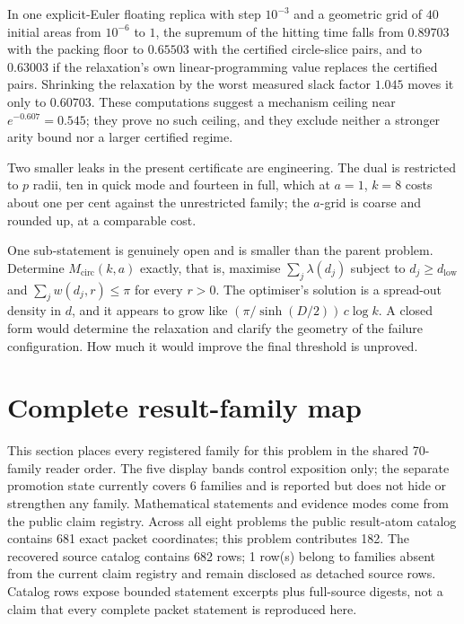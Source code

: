 \documentclass[11pt]{article}
\begin{document}
In one explicit-Euler floating replica with step $10^{-3}$ and a geometric grid
of $40$ initial areas from $10^{-6}$ to $1$, the supremum of the hitting time
falls from $0.89703$ with the packing floor to $0.65503$ with the certified
circle-slice pairs, and to $0.63003$ if the relaxation's own linear-programming
value replaces the certified pairs.  Shrinking the relaxation by the worst
measured slack factor $1.045$ moves it only to $0.60703$.  These computations
suggest a mechanism ceiling near $e^{-0.607}=0.545$; they prove no such
ceiling, and they exclude neither a stronger arity bound nor a larger certified
regime.

Two smaller leaks in the present certificate are engineering.  The dual is
restricted to $p$ radii, ten in quick mode and fourteen in full, which at
$a=1$, $k=8$ costs about one per cent against the unrestricted family; the
$a$-grid is coarse and rounded up, at a comparable cost.

One sub-statement is genuinely open and is smaller than the parent problem.
Determine $M_{\mathrm{circ}}(k,a)$ exactly, that is, maximise
$\sum_j\lambda(d_j)$ subject to $d_j\ge d_{\mathrm{low}}$ and
$\sum_jw(d_j,r)\le\pi$ for every $r>0$.  The optimiser's solution is a
spread-out density in $d$, and it appears to grow like
$(\pi/\sinh(D/2))\,c\log k$.  A closed form would determine the relaxation and
clarify the geometry of the failure configuration.  How much it would improve
the final threshold is unproved.

\clearpage
\section{Complete result-family map}\label{sec:erdos-1041-complete-family-map}

This section places every registered family for this problem in the shared 70-family reader order.  The five display bands control exposition only; the separate promotion state currently covers 6 families and is reported but does not hide or strengthen any family.  Mathematical statements and evidence modes come from the public claim registry.  Across all eight problems the public result-atom catalog contains 681 exact packet coordinates; this problem contributes 182.  The recovered source catalog contains 682 rows; 1 row(s) belong to families absent from the current claim registry and remain disclosed as detached source rows.  Catalog rows expose bounded statement excerpts plus full-source digests, not a claim that every complete packet statement is reproduced here.
\end{document}
